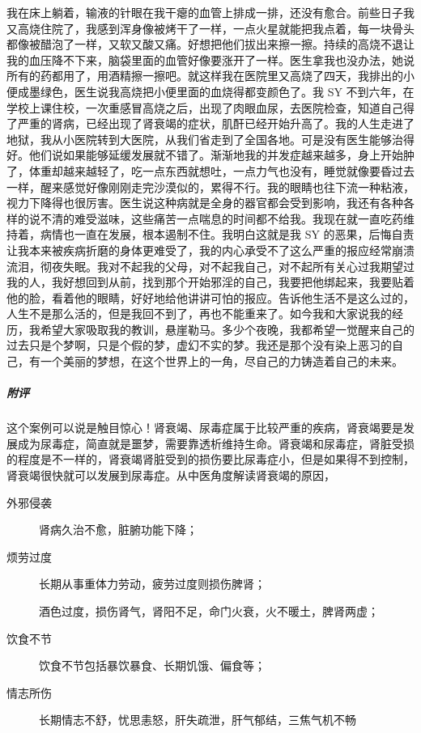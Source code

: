 \begin{case}
    我在床上躺着，输液的针眼在我干瘪的血管上排成一排，还没有愈合。前些日子我又高烧住院了，我感到浑身像被烤干了一样，一点火星就能把我点着，每一块骨头都像被醋泡了一样，又软又酸又痛。好想把他们拔出来擦一擦。持续的高烧不退让我的血压降不下来，脑袋里面的血管好像要涨开了一样。医生拿我也没办法，她说所有的药都用了，用酒精擦一擦吧。就这样我在医院里又高烧了四天，我排出的小便成墨绿色，医生说我高烧把小便里面的血烧得都变颜色了。我 SY 不到六年，在学校上课住校，一次重感冒高烧之后，出现了肉眼血尿，去医院检查，知道自己得了严重的肾病，已经出现了肾衰竭的症状，肌酐已经开始升高了。我的人生走进了地狱，我从小医院转到大医院，从我们省走到了全国各地。可是没有医生能够治得好。他们说如果能够延缓发展就不错了。渐渐地我的并发症越来越多，身上开始肿了，体重却越来越轻了，吃一点东西就想吐，一点力气也没有，睡觉就像要昏过去一样，醒来感觉好像刚刚走完沙漠似的，累得不行。我的眼睛也往下流一种粘液，视力下降得也很厉害。医生说这种病就是全身的器官都会受到影响，我还有各种各样的说不清的难受滋味，这些痛苦一点喘息的时间都不给我。我现在就一直吃药维持着，病情也一直在发展，根本遏制不住。我明白这就是我 SY 的恶果，后悔自责让我本来被疾病折磨的身体更难受了，我的内心承受不了这么严重的报应经常崩溃流泪，彻夜失眠。我对不起我的父母，对不起我自己，对不起所有关心过我期望过我的人，我好想回到从前，找到那个开始邪淫的自己，我要把他绑起来，我要贴着他的脸，看着他的眼睛，好好地给他讲讲可怕的报应。告诉他生活不是这么过的，人生不是那么活的，但是我回不到了，再也不能重来了。如今我和大家说我的经历，我希望大家吸取我的教训，悬崖勒马。多少个夜晚，我都希望一觉醒来自己的过去只是个梦啊，只是个假的梦，虚幻不实的梦。我还是那个没有染上恶习的自己，有一个美丽的梦想，在这个世界上的一角，尽自己的力铸造着自己的未来。
    \subparagraph{附评} 这个案例可以说是触目惊心！肾衰竭、尿毒症属于比较严重的疾病，肾衰竭要是发展成为尿毒症，简直就是噩梦，需要靠透析维持生命。肾衰竭和尿毒症，肾脏受损的程度是不一样的，肾衰竭肾脏受到的损伤要比尿毒症小，但是如果得不到控制，肾衰竭很快就可以发展到尿毒症。从中医角度解读肾衰竭的原因，\begin{description}
        \item[外邪侵袭] 肾病久治不愈，脏腑功能下降；
        \item[烦劳过度] 长期从事重体力劳动，疲劳过度则损伤脾肾；
        \item[] 酒色过度，损伤肾气，肾阳不足，命门火衰，火不暖土，脾肾两虚；
        \item[饮食不节] 饮食不节包括暴饮暴食、长期饥饿、偏食等；
        \item[情志所伤] 长期情志不舒，忧思恚怒，肝失疏泄，肝气郁结，三焦气机不畅

\end{description}
\end{case}
